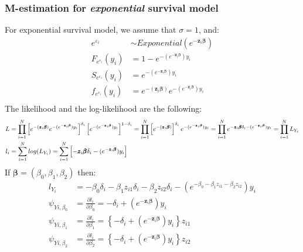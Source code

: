 \documentclass[]{article}
\let\epsilon\varepsilon
\begin{document}
\subsubsection{M-estimation for \emph{exponential} survival model}
For exponential survival model, we assume that $\sigma = 1$, and:
  $$
  \begin{aligned}
    e^{\epsilon_{i}} &\sim Exponential(e^{-\pmb{z}_i \pmb{\beta}})\\
    F_{e^{\epsilon_{i}}}(y_i) &= 1 - e^{-(e^{-\pmb{z}_i \pmb{\beta}})y_i}\\
    S_{e^{\epsilon_{i}}}(y_i) &= e^{-(e^{-\pmb{z}_i \pmb{\beta}})y_i}\\
    f_{e^{\epsilon_{i}}}(y_i) &= e^{-\left(\pmb{z}_i \pmb{\beta}\right)}e^{-(e^{-\pmb{z}_i \pmb{\beta}})y_i}\\
  \end{aligned}
  $$
The likelihood and the log-likelihood are the following:
  $$
  \begin{aligned}
    L &= \prod_{i=1}^N  \left[ e^{-\left(\pmb{z}_i \pmb{\beta}\right)}e^{-(e^{-\pmb{z}_i \pmb{\beta}})y_i} \right]^{\delta_i} \left[e^{-(e^{-\pmb{z}_i \pmb{\beta}})y_i}\right]^{1-\delta_i} =\prod_{i=1}^N   \left[e^{-\left(\pmb{z}_i \pmb{\beta}\right)}\right]^{\delta_i}   e^{-(e^{-\pmb{z}_i \pmb{\beta}})y_i} = \prod_{i=1}^N   e^{-\pmb{z}_i \pmb{\beta}\delta_i-(e^{-\pmb{z}_i \pmb{\beta}})y_i}=\prod_{i=1}^N L_{Y_i}\\
    l_i &=\sum_{i=1}^N log(L_{Y_i}) =\sum_{i=1}^N  \left[  -\pmb{z}_i \pmb{\beta}\delta_i-(e^{-\pmb{z}_i \pmb{\beta}})y_i \right]
  \end{aligned}\\
  $$
If $\pmb{\beta} = (\beta_0, \beta_1, \beta_2)$ then:
  $$
  \begin{aligned}
    l_{Y_i} &=   -\beta_0\delta_i-\beta_1 z_{i1}\delta_i-\beta_2z_{i2}\delta_i-(e^{-\beta_0-\beta_1 z_{i1}-\beta_2z_{i2} })y_i \\
    \psi_{Yi,\beta_0} &= \frac{\partial l_i}{\partial \beta_0} =  -\delta_i+\left(e^{-\pmb{z}_i \pmb{\beta}}\right)y_i\\
    \psi_{Yi,\beta_1} &= \frac{\partial l_i}{\partial \beta_1} =  \left\{-\delta_i+\left(e^{-\pmb{z}_i \pmb{\beta}}\right)y_i\right\}z_{i1} \\
    \psi_{Yi,\beta_2} &= \frac{\partial l_i}{\partial \beta_2} =  \left\{-\delta_i+\left(e^{-\pmb{z}_i \pmb{\beta}}\right)y_i\right\}z_{i2} \\
  \end{aligned}
  $$
  
\end{document}
